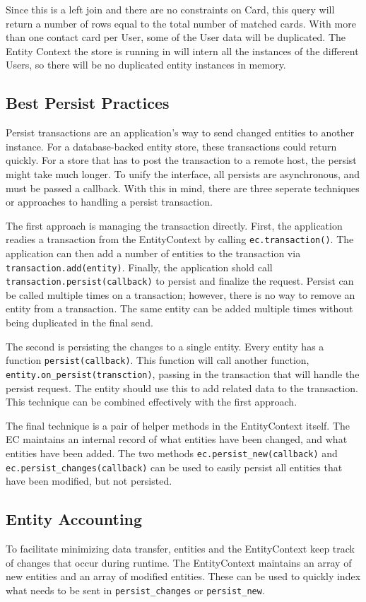 \documentclass{article}
\begin{document}
\linespread{1.6}
Since this is a left join and there are no constraints on Card, this query will
return a number of rows equal to the total number of matched cards. With more
than one contact card per User, some of the User data will be duplicated. The
Entity Context the store is running in will intern all the instances of the
different Users, so there will be no duplicated entity instances in memory.

\subsection{Best Persist Practices}
Persist transactions are an application's way to send changed entities to
another instance. For a database-backed entity store, these transactions could
return quickly. For a store that has to post the transaction to a remote host,
the persist might take much longer. To unify the interface, all persists are
asynchronous, and must be passed a callback. With this in mind, there are three
seperate techniques or approaches to handling a persist transaction.

The first approach is managing the transaction directly. First, the application
readies a transaction from the EntityContext by calling {\tt ec.transaction()}.
The application can then add a number of entities to the transaction via
{\tt transaction.add(entity)}. Finally, the application shold call
{\tt transaction.persist(callback)} to persist and finalize the request. Persist
can be called multiple times on a transaction; however, there is no way to
remove an entity from a transaction. The same entity can be added multiple times
without being duplicated in the final send.

The second is persisting the changes to a single entity. Every entity has a
function {\tt persist(callback)}. This function will call another function,
{\tt entity.on\_persist(transction)}, passing in the transaction that will
handle the persist request. The entity should use this to add related data to
the transaction. This technique can be combined effectively with the first
approach.

The final technique is a pair of helper methods in the EntityContext itself. The
EC maintains an internal record of what entities have been changed, and what
entities have been added. The two methods {\tt ec.persist\_new(callback)} and
{\tt ec.persist\_changes(callback)} can be used to easily persist all entities
that have been modified, but not persisted.

\subsection{Entity Accounting}
To facilitate minimizing data transfer, entities and the EntityContext keep
track of changes that occur during runtime. The EntityContext maintains an array
of new entities and an array of modified entities. These can be used to quickly
index what needs to be sent in {\tt persist\_changes} or {\tt persist\_new}.
\end{document}
